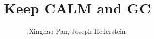 \documentclass{sig-alternate-10}
\title{Keep CALM and GC}
\author{Xinghao Pan, Joseph Hellerstein}
\numberwithin{equation}{section}
\begin{document}
\maketitle




























\balancecolumns


\newpage\onecolumn
\appendix



\end{document}
